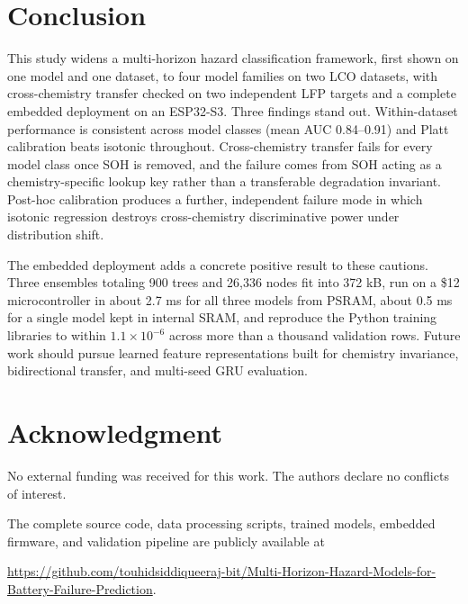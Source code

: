 \documentclass[journal]{IEEEtran}
\begin{document}
\section{Conclusion}
This study widens a multi-horizon hazard classification framework, first shown on one model and one dataset, to four model families on two LCO datasets, with cross-chemistry transfer checked on two independent LFP targets and a complete embedded deployment on an ESP32-S3. Three findings stand out. Within-dataset performance is consistent across model classes (mean AUC 0.84--0.91) and Platt calibration beats isotonic throughout. Cross-chemistry transfer fails for every model class once SOH is removed, and the failure comes from SOH acting as a chemistry-specific lookup key rather than a transferable degradation invariant. Post-hoc calibration produces a further, independent failure mode in which isotonic regression destroys cross-chemistry discriminative power under distribution shift.

The embedded deployment adds a concrete positive result to these cautions. Three ensembles totaling 900 trees and 26,336 nodes fit into 372 kB, run on a \$12 microcontroller in about 2.7 ms for all three models from PSRAM, about 0.5 ms for a single model kept in internal SRAM, and reproduce the Python training libraries to within $1.1\times10^{-6}$ across more than a thousand validation rows. Future work should pursue learned feature representations built for chemistry invariance, bidirectional transfer, and multi-seed GRU evaluation.

\section*{Acknowledgment}
No external funding was received for this work. The authors declare no conflicts of interest.

The complete source code, data processing scripts, trained models, embedded firmware, and validation pipeline are publicly available at

{\small\url{https://github.com/touhidsiddiqueeraj-bit/Multi-Horizon-Hazard-Models-for-Battery-Failure-Prediction}}.
\end{document}
